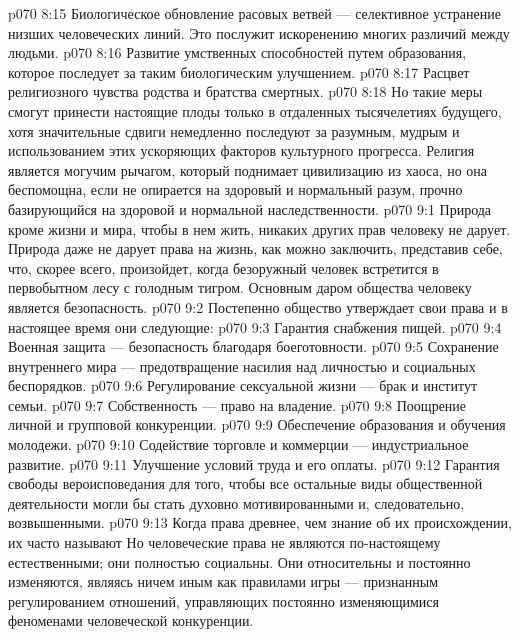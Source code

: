 \vs p070 8:15 \bibnobreakspace Биологическое обновление расовых ветвей --- селективное устранение низших человеческих линий. Это послужит искоренению многих различий между людьми.
\vs p070 8:16 \bibnobreakspace Развитие умственных способностей путем образования, которое последует за таким биологическим улучшением.
\vs p070 8:17 \bibnobreakspace Расцвет религиозного чувства родства и братства смертных.
\vs p070 8:18 \pc Но такие меры смогут принести настоящие плоды только в отдаленных тысячелетиях будущего, хотя значительные сдвиги немедленно последуют за разумным, мудрым и  использованием этих ускоряющих факторов культурного прогресса. Религия является могучим рычагом, который поднимает цивилизацию из хаоса, но она беспомощна, если не опирается на здоровый и нормальный разум, прочно базирующийся на здоровой и нормальной наследственности.
\vs p070 9:1 Природа кроме жизни и мира, чтобы в нем жить, никаких других прав человеку не дарует. Природа даже не дарует права на жизнь, как можно заключить, представив себе, что, скорее всего, произойдет, когда безоружный человек встретится в первобытном лесу с голодным тигром. Основным даром общества человеку является безопасность.
\vs p070 9:2 \pc Постепенно общество утверждает свои права и в настоящее время они следующие:
\vs p070 9:3 \bibnobreakspace Гарантия снабжения пищей.
\vs p070 9:4 \bibnobreakspace Военная защита --- безопасность благодаря боеготовности.
\vs p070 9:5 \bibnobreakspace Сохранение внутреннего мира --- предотвращение насилия над личностью и социальных беспорядков.
\vs p070 9:6 \bibnobreakspace Регулирование сексуальной жизни --- брак и институт семьи.
\vs p070 9:7 \bibnobreakspace Собственность --- право на владение.
\vs p070 9:8 \bibnobreakspace Поощрение личной и групповой конкуренции.
\vs p070 9:9 \bibnobreakspace Обеспечение образования и обучения молодежи.
\vs p070 9:10 \bibnobreakspace Содействие торговле и коммерции --- индустриальное развитие.
\vs p070 9:11 \bibnobreakspace Улучшение условий труда и его оплаты.
\vs p070 9:12 \bibnobreakspace Гарантия свободы вероисповедания для того, чтобы все остальные виды общественной деятельности могли бы стать духовно мотивированными и, следовательно, возвышенными.
\vs p070 9:13 \pc Когда права древнее, чем знание об их происхождении, их часто называют  Но человеческие права не являются по\hyp{}настоящему естественными; они полностью социальны. Они относительны и постоянно изменяются, являясь ничем иным как правилами игры --- признанным регулированием отношений, управляющих постоянно изменяющимися феноменами человеческой конкуренции.
